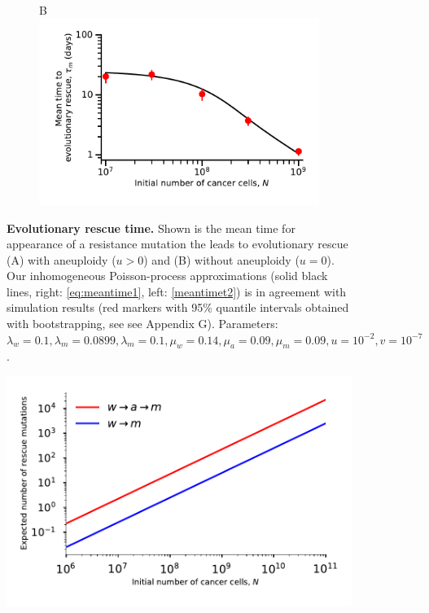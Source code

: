 \documentclass[12pt]{extarticle}
\begin{document}
\begin{appendices}
\begin{figure}[!htb]
\begin{subfigure}{0.5\textwidth}
\end{subfigure}
\begin{subfigure}{0.5\textwidth}
B\\
\includegraphics[width=1\textwidth]{Figures/MeanTimeGrowthMutantDirectPlot.pdf}
\end{subfigure}
\caption{\textbf{Evolutionary rescue time.}
Shown is the mean time for appearance of a resistance mutation the leads to evolutionary rescue (A) with aneuploidy ($u>0$) and (B) without aneuploidy ($u=0$).
Our inhomogeneous Poisson-process approximations (solid black lines, right: \cref{eq:meantime1}, left: \cref{meantimet2}) is in agreement with simulation results (red markers with 95\% quantile intervals obtained with bootstrapping, see see Appendix G). 
Parameters: $\lambda_w=0.1,\lambda_m=0.0899,\lambda_m=0.1,\mu_w=0.14,\mu_a=0.09,\mu_m=0.09, u=10^{-2}, v=10^{-7}$.
}
\label{MeanTimeGrowthAneuploidyPlot} 
\end{figure}
\begin{figure}
\vspace*{1\baselineskip}
\includegraphics[width=1\textwidth]{Figures/ExpectedNumber.pdf}

\end{figure}
\end{appendices}
\end{document}

